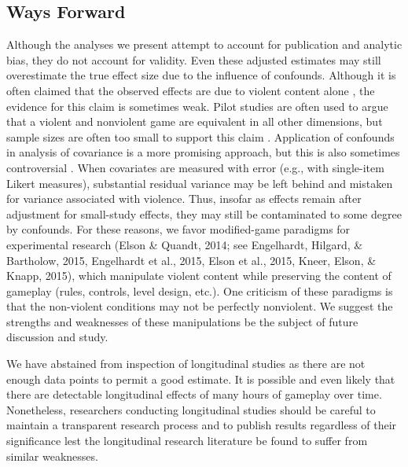\documentclass[man]{apa6}
\begin{document}
\subsection{Ways Forward}
Although the analyses we present attempt to account for publication and analytic bias, they do not account for validity. Even these adjusted estimates may still overestimate the true effect size due to the influence of confounds. Although it is often claimed that the observed effects are due to violent content alone \citep[][e.g.,]{Anderson:etal:2004}, the evidence for this claim is sometimes weak. Pilot studies are often used to argue that a violent and nonviolent game are equivalent in all other dimensions, but sample sizes are often too small to support this claim \citep{Hilgard:etal:2015}. Application of confounds in analysis of covariance is a more promising approach, but this is also sometimes controversial \citep{Miller:Chapman:2001}. When covariates are measured with error (e.g., with single-item Likert measures), substantial residual variance may be left behind and mistaken for variance associated with violence. Thus, insofar as effects remain after adjustment for small-study effects, they may still be contaminated to some degree by confounds. For these reasons, we favor modified-game paradigms for experimental research (Elson \& Quandt, 2014; see Engelhardt, Hilgard, \& Bartholow, 2015, Engelhardt et al., 2015, Elson et al., 2015, Kneer, Elson, \& Knapp, 2015), which manipulate violent content while preserving the content of gameplay (rules, controls, level design, etc.). One criticism of these paradigms is that the non-violent conditions may not be perfectly nonviolent. We suggest the strengths and weaknesses of these manipulations be the subject of future discussion and study.

We have abstained from inspection of longitudinal studies as there are not enough data points to permit a good estimate. It is possible and even likely that there are detectable longitudinal effects of many hours of gameplay over time. Nonetheless, researchers conducting longitudinal studies should be careful to maintain a transparent research process and to publish results regardless of their significance lest the longitudinal research literature be found to suffer from similar weaknesses.
\end{document}
